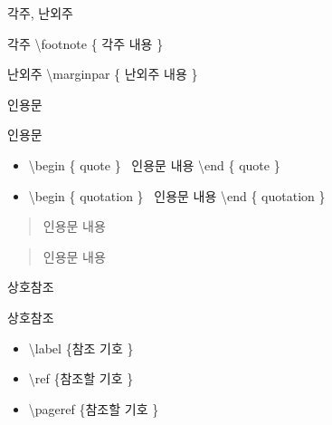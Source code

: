 \documentclass[ aspectratio=149,  14pt,blue,xcolor=pdftex,dvipsnames,table,handout,notes]{beamer}
\begin{document}

		\begin{frame}[t]{각주, 난외주}

			\begin{block} {각주}
			\textbackslash footnote \{ 각주 내용 \}
			\end{block}

			\begin{block} {난외주}
			\textbackslash marginpar \{ 난외주 내용 \}
			\end{block}


		\end{frame}




		\begin{frame}[t]{인용문}

			\begin{block} {인용문}
			\begin{itemize}
			\item[]	\textbackslash begin \{ quote \} ~인용문 내용 \textbackslash end \{ quote \} \\
			\item[]	\textbackslash begin \{ quotation \} ~인용문 내용 \textbackslash end \{ quotation \} 
			\end{itemize}
			\end{block}

			\begin{example}
				\begin{quote} 인용문 내용 \end{quote} 
				\begin{quotation} 인용문 내용 \end{quotation}
			\end{example}


		\end{frame}






		\begin{frame}[t]{상호참조}

			\begin{block} {상호참조}
				\begin{itemize}
				\item \textbackslash label \{참조 기호 \}
				\item \textbackslash ref \{참조할 기호 \}
				\item \textbackslash pageref \{참조할 기호 \}
				\end{itemize}
			\end{block}

		\end{frame}
\end{document}
